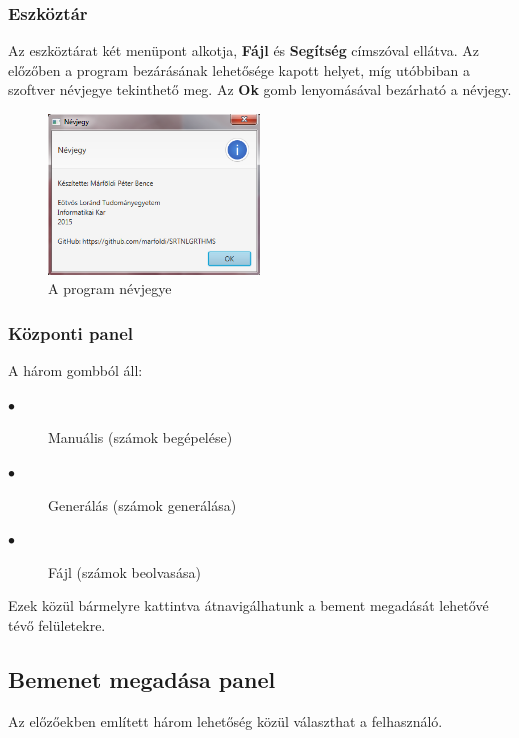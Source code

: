 \documentclass{elteikthesis}
\begin{document}
\subsubsection{Eszköztár}
Az eszköztárat két menüpont alkotja, \textbf{Fájl} és \textbf{Segítség} címszóval ellátva. Az előzőben a program bezárásának lehetősége kapott helyet, míg utóbbiban a szoftver névjegye tekinthető meg. Az \textbf{Ok} gomb lenyomásával bezárható a névjegy.
\begin{figure}[H]
	\centering
	\includegraphics[width=0.5\textwidth]{pics/about.png}
	\caption{A program névjegye}
\end{figure}

\subsubsection{Központi panel}
A három gombból áll:
\begin{description}
	\item[$\bullet$] Manuális (számok begépelése)
	\item[$\bullet$] Generálás (számok generálása) 
	\item[$\bullet$] Fájl (számok beolvasása)
\end{description}
Ezek közül bármelyre kattintva átnavigálhatunk a bement megadását lehetővé tévő felületekre.

\subsection{Bemenet megadása panel}
Az előzőekben említett három lehetőség közül választhat a felhasználó.
\end{document}

